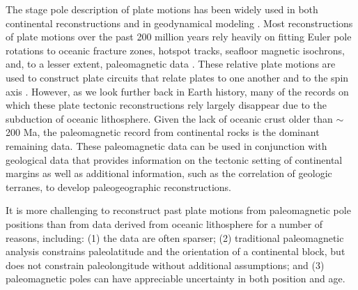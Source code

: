 \documentclass[11pt,letterpaper]{article}
\begin{document}

The stage pole description of plate motions has been widely used in both continental reconstructions \citep[e.g.][]{Boyden2011a} and in geodynamical modeling \citep[e.g.][]{Mcnamara2005a, Bull2014a}. Most reconstructions of plate motions over the past 200 million years rely heavily on fitting Euler pole rotations to oceanic fracture zones, hotspot tracks, seafloor magnetic isochrons, and, to a lesser extent, paleomagnetic data \citep{Muller1993a, Seton2012a, Muller2016a}. These relative plate motions are used to construct plate circuits that relate plates to one another and to the spin axis \citep[e.g.][]{Muller2016a, Torsvik2017a}. However, as we look further back in Earth history, many of the records on which these plate tectonic reconstructions rely largely disappear due to the subduction of oceanic lithosphere. Given the lack of oceanic crust older than $\sim$200 Ma, the paleomagnetic record from continental rocks is the dominant remaining data. These paleomagnetic data can be used in conjunction with geological data that provides information on the tectonic setting of continental margins as well as additional information, such as the correlation of geologic terranes, to develop paleogeographic reconstructions.

It is more challenging to reconstruct past plate motions from paleomagnetic pole positions than from data derived from oceanic lithosphere for a number of reasons, including: (1) the data are often sparser; (2) traditional paleomagnetic analysis constrains paleolatitude and the orientation of a continental block, but does not constrain paleolongitude without additional assumptions; and (3) paleomagnetic poles can have appreciable uncertainty in both position and age.
\end{document}

